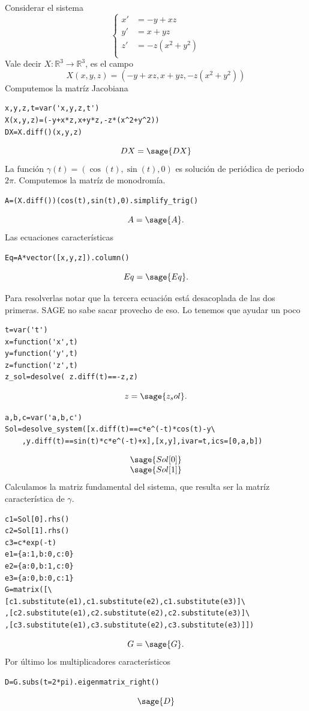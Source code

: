\begin{ejemplo}{}\emph{\cite[ Ejemplo 6.3 ]{DavidBetounes488}} Considerar el sistema
\[
\left\{
 \begin{array}{cc}
  x'&=-y+xz\\
  y'&=x+yz\\
  z'&=-z(x^2+y^2)\\
 \end{array}
\right.
\]
Vale decir $X:\mathbb{R}^3\to\mathbb{R}^3$, es el campo
\[X(x,y,z)=(-y+xz,x+yz,-z(x^2+y^2))\]
Computemos la matríz Jacobiana
\begin{lstlisting}
x,y,z,t=var('x,y,z,t')
X(x,y,z)=(-y+x*z,x+y*z,-z*(x^2+y^2))
DX=X.diff()(x,y,z)
\end{lstlisting}

\[
DX=\sage{DX}
\]
La función  $\gamma(t)=(\cos(t),\sin(t),0)$ es solución de periódica de periodo $2\pi$. Computemos la matríz de monodromía.
\begin{lstlisting}
A=(X.diff())(cos(t),sin(t),0).simplify_trig()
\end{lstlisting}
\[A=\sage{A}.\]
 Las ecuaciones características
\begin{lstlisting}
Eq=A*vector([x,y,z]).column()
\end{lstlisting}
\[Eq=\sage{Eq}.\]

Para resolverlas notar que la tercera ecuación está desacoplada de las dos primeras.  SAGE no sabe sacar provecho de eso. Lo tenemos que ayudar un poco
\begin{lstlisting}
t=var('t')
x=function('x',t)
y=function('y',t)
z=function('z',t)
z_sol=desolve( z.diff(t)==-z,z)
\end{lstlisting}
\[z=\sage{z_sol}.\]
\begin{lstlisting}
a,b,c=var('a,b,c')
Sol=desolve_system([x.diff(t)==c*e^(-t)*cos(t)-y\
    ,y.diff(t)==sin(t)*c*e^(-t)+x],[x,y],ivar=t,ics=[0,a,b])
\end{lstlisting}
\[
 \begin{array}{l}
  \sage{Sol[0]}\\
  \sage{Sol[1]}
 \end{array}
\]
Calculamos la matriz fundamental del sistema, que resulta ser la matríz característica de $\gamma$.
\begin{lstlisting}
c1=Sol[0].rhs()
c2=Sol[1].rhs()
c3=c*exp(-t)
e1={a:1,b:0,c:0}
e2={a:0,b:1,c:0}
e3={a:0,b:0,c:1}
G=matrix([\
[c1.substitute(e1),c1.substitute(e2),c1.substitute(e3)]\
,[c2.substitute(e1),c2.substitute(e2),c2.substitute(e3)]\
,[c3.substitute(e1),c3.substitute(e2),c3.substitute(e3)]])

\end{lstlisting}
\[G=\sage{G}.\]
Por último los multiplicadores característicos

\begin{lstlisting}
D=G.subs(t=2*pi).eigenmatrix_right()
\end{lstlisting}
\[\sage{D}\]
\end{ejemplo}

